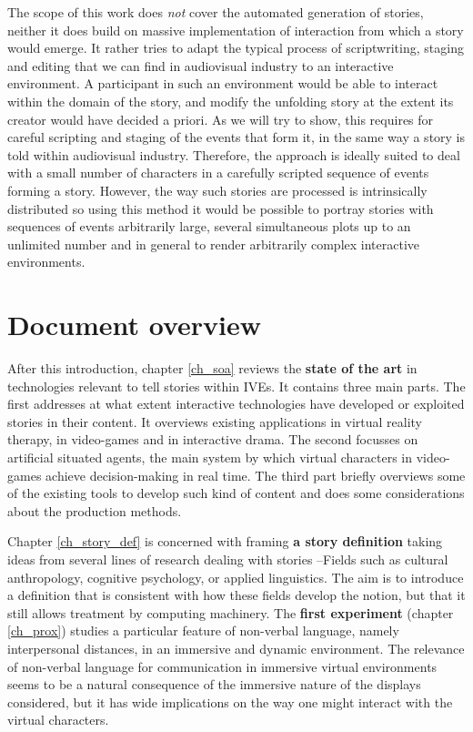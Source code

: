 \documentclass[
		twoside,openright,titlepage,numbers=noenddot,manychapters,
		headinclude,%
                footinclude=false,cleardoublepage=empty,
                BCOR=5mm,
		fontsize=11pt, %
                 enabledeprecatedfontcommands]{scrreprt}
\begin{document}
 The scope of this work does \emph{not} cover the automated generation of stories, neither it does build on massive implementation of interaction from which a story would emerge. It rather tries to adapt the typical process of scriptwriting, staging and editing that we can find in audiovisual industry to an interactive environment. A participant in such an environment would be able to interact within the domain of the story, and modify the unfolding story at the extent its creator would have decided a priori. As we will try to show, this requires for careful scripting and staging of the events that form it, in the same way a story is told within audiovisual industry. Therefore, the approach is ideally suited to deal with a small number of characters in a carefully scripted sequence of events forming a story. However, the way such stories are processed is intrinsically distributed so using this method it would be possible to portray stories with sequences of events arbitrarily large, several simultaneous plots up to an unlimited number and in general to render arbitrarily complex interactive environments.

\section{Document overview}

After this introduction, chapter \ref{ch_soa}  reviews the \textbf{state of the art} in technologies relevant to tell stories within IVEs. It contains three main parts. The first addresses at what extent interactive technologies have developed or exploited stories in their content. It overviews existing applications in virtual reality therapy, in video-games and in interactive drama. The second   focusses on artificial situated agents, the main system by which virtual characters in video-games achieve decision-making in real time. The third part briefly overviews some of the existing tools to develop such kind of content and does some considerations about the production methods.

Chapter \ref{ch_story_def} is concerned with framing \textbf{a story definition}  taking ideas from several lines of research dealing with stories --Fields such as cultural anthropology, cognitive psychology, or applied linguistics. The aim is to introduce a definition that is consistent with how these fields develop the notion, but that it still allows treatment by computing machinery. The \textbf{first experiment} (chapter \ref{ch_prox}) studies a particular feature of non-verbal language, namely interpersonal distances, in an immersive and dynamic environment. The relevance of non-verbal language for communication in  immersive virtual environments seems to be a natural consequence of the immersive nature of the displays considered, but it has wide implications on the way one might interact with the virtual characters.
\end{document}
